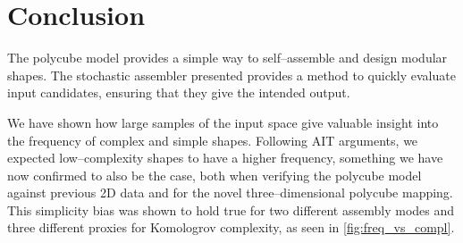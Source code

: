 







\section{Conclusion}
The polycube model provides a simple way to self--assemble and design modular shapes. The stochastic assembler presented provides a method to quickly evaluate input candidates, ensuring that they give the intended output.

We have shown how large samples of the input space give valuable insight into the frequency of complex and simple shapes. Following AIT arguments, we expected low--complexity shapes to have a higher frequency, something we have now confirmed to also be the case, both when verifying the polycube model against previous 2D data and for the novel three--dimensional polycube mapping. This simplicity bias was shown to hold true for two different assembly modes and three different proxies for Komologrov complexity, as seen in \ref{fig:freq_vs_compl}.

